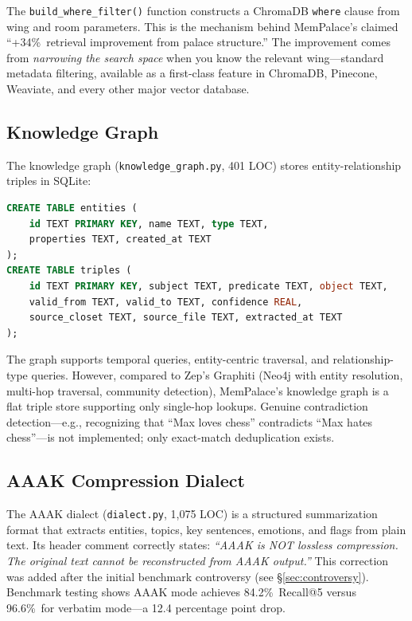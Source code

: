 \documentclass[twoside,11pt]{article}
\begin{document}
The \texttt{build\_where\_filter()} function constructs a ChromaDB
\texttt{where} clause from wing and room parameters.  This is the mechanism
behind MemPalace's claimed ``+34\%\ retrieval improvement from palace
structure.''  The improvement comes from \emph{narrowing the search space}
when you know the relevant wing---standard metadata filtering, available as a
first-class feature in ChromaDB, Pinecone, Weaviate, and every other major
vector database.

\subsection{Knowledge Graph}

The knowledge graph (\texttt{knowledge\_graph.py}, 401 LOC) stores
entity-relationship triples in SQLite:

\begin{lstlisting}[language=SQL, caption={Knowledge graph schema}]
CREATE TABLE entities (
    id TEXT PRIMARY KEY, name TEXT, type TEXT,
    properties TEXT, created_at TEXT
);
CREATE TABLE triples (
    id TEXT PRIMARY KEY, subject TEXT, predicate TEXT, object TEXT,
    valid_from TEXT, valid_to TEXT, confidence REAL,
    source_closet TEXT, source_file TEXT, extracted_at TEXT
);
\end{lstlisting}

The graph supports temporal queries, entity-centric traversal, and
relationship-type queries.  However, compared to Zep's Graphiti (Neo4j with
entity resolution, multi-hop traversal, community detection), MemPalace's
knowledge graph is a flat triple store supporting only single-hop lookups.
Genuine contradiction detection---e.g., recognizing that ``Max loves chess''
contradicts ``Max hates chess''---is not implemented; only exact-match
deduplication exists.

\subsection{AAAK Compression Dialect}

The AAAK dialect (\texttt{dialect.py}, 1{,}075 LOC) is a structured
summarization format that extracts entities, topics, key sentences, emotions,
and flags from plain text.  Its header comment correctly states: \emph{``AAAK
is NOT lossless compression.  The original text cannot be reconstructed from
AAAK output.''}  This correction was added after the initial benchmark
controversy (see \S\ref{sec:controversy}).  Benchmark testing shows AAAK mode
achieves 84.2\%\ Recall@5 versus 96.6\%\ for verbatim mode---a 12.4
percentage point drop.
\end{document}
